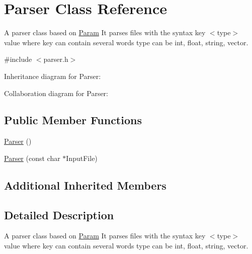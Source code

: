 \hypertarget{classParser}{\section{Parser Class Reference}
\label{classParser}
}


A parser class based on \hyperlink{classParam}{Param} It parses files with the syntax key $<$type$>$ value where key can contain several words type can be int, float, string, vector.  




{\ttfamily \#include $<$parser.\-h$>$}



Inheritance diagram for Parser\-:


Collaboration diagram for Parser\-:
\subsection*{Public Member Functions}
\begin{DoxyCompactItemize}
\item 
\hyperlink{classParser_a12234f6cd36b61af4b50c94a179422c1}{Parser} ()
\item 
\hyperlink{classParser_ae3012c947e9d131330b5cf510ba8bc2c}{Parser} (const char $\ast$Input\-File)
\end{DoxyCompactItemize}
\subsection*{Additional Inherited Members}


\subsection{Detailed Description}
A parser class based on \hyperlink{classParam}{Param} It parses files with the syntax key $<$type$>$ value where key can contain several words type can be int, float, string, vector. 


